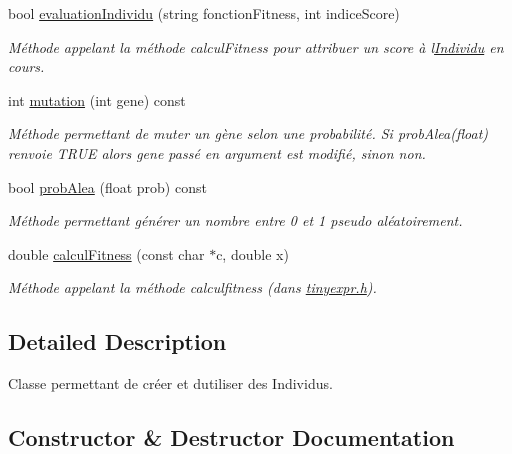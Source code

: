 \begin{DoxyCompactItemize}
bool \hyperlink{class_individu_a85811f58ed4c57e4ae584117d553cc7c}{evaluation\+Individu} (string fonction\+Fitness, int indice\+Score)
\begin{DoxyCompactList}\small\item\em Méthode appelant la méthode calcul\+Fitness pour attribuer un score à l\textquotesingle{}\hyperlink{class_individu}{Individu} en cours. \end{DoxyCompactList}\item 
int \hyperlink{class_individu_aaff224cb5b2c74d327d71c89e7494c84}{mutation} (int gene) const
\begin{DoxyCompactList}\small\item\em Méthode permettant de muter un gène selon une probabilité. Si prob\+Alea(float) renvoie T\+R\+UE alors gene passé en argument est modifié, sinon non. \end{DoxyCompactList}\item 
bool \hyperlink{class_individu_aa370ed54c9e5cecffc479b5874e9226b}{prob\+Alea} (float prob) const
\begin{DoxyCompactList}\small\item\em Méthode permettant générer un nombre entre 0 et 1 pseudo aléatoirement. \end{DoxyCompactList}\item 
double \hyperlink{class_individu_a64f2fa488b556be95d6dda1005417eb6}{calcul\+Fitness} (const char $\ast$c, double x)
\begin{DoxyCompactList}\small\item\em Méthode appelant la méthode calculfitness (dans \hyperlink{tinyexpr_8h_source}{tinyexpr.\+h}). \end{DoxyCompactList}\end{DoxyCompactItemize}


\subsection{Detailed Description}
Classe permettant de créer et d\textquotesingle{}utiliser des Individus. 

\subsection{Constructor \& Destructor Documentation}
\mbox{\label{class_individu_aeb49b6d2654ce47c70847d27a2608b47}} 

